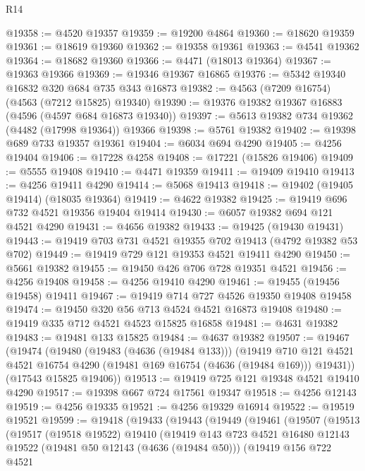 \begin{lexlean}{R14}
\begin{coremodule}
@19358 := @4520 @19357
@19359 := @19200 @4864
@19360 := @18620 @19359
@19361 := @18619 @19360
@19362 := @19358 @19361
@19363 := @4541 @19362
@19364 := @18682 @19360
@19366 := @4471 (@18013 @19364)
@19367 := @19363 @19366
@19369 := @19346 @19367 @16865
@19376 := @5342 @19340 @16832 @320 @684 @735 @343 @16873
@19382 := @4563 (@7209 @16754) (@4563 (@7212 @15825) @19340)
@19390 := @19376 @19382 @19367 @16883 (@4596 (@4597 @684 @16873 @19340))
@19397 := @5613 @19382 @734 @19362 (@4482 (@17998 @19364)) @19366
@19398 := @5761 @19382
@19402 := @19398 @689 @733 @19357 @19361
@19404 := @6034 @694 @4290
@19405 := @4256 @19404
@19406 := @17228 @4258
@19408 := @17221 (@15826 @19406)
@19409 := @5555 @19408
@19410 := @4471 @19359
@19411 := @19409 @19410
@19413 := @4256 @19411 @4290
@19414 := @5068 @19413
@19418 := @19402 (@19405 @19414) (@18035 @19364)
@19419 := @4622 @19382
@19425 := @19419 @696 @732 @4521 @19356 @19404 @19414
@19430 := @6057 @19382 @694 @121 @4521 @4290
@19431 := @4656 @19382
@19433 := @19425 (@19430 @19431)
@19443 := @19419 @703 @731 @4521 @19355 @702 @19413 (@4792 @19382 @53 @702)
@19449 := @19419 @729 @121 @19353 @4521 @19411 @4290
@19450 := @5661 @19382
@19455 := @19450 @426 @706 @728 @19351 @4521
@19456 := @4256 @19408
@19458 := @4256 @19410 @4290
@19461 := @19455 (@19456 @19458) @19411
@19467 := @19419 @714 @727 @4526 @19350 @19408 @19458
@19474 := @19450 @320 @56 @713 @4524 @4521 @16873 @19408
@19480 := @19419 @335 @712 @4521 @4523 @15825 @16858
@19481 := @4631 @19382
@19483 := @19481 @133 @15825
@19484 := @4637 @19382
@19507 := @19467
    (@19474
      (@19480
        (@19483 (@4636 (@19484 @133)))
        (@19419
          @710
          @121
          @4521
          @4521
          @16754
          @4290
          (@19481 @169 @16754 (@4636 (@19484 @169)))
          @19431))
      (@17543 @15825 @19406))
@19513 := @19419 @725 @121 @19348 @4521 @19410 @4290
@19517 := @19398 @667 @724 @17561 @19347
@19518 := @4256 @12143
@19519 := @4256 @19335
@19521 := @4256 @19329 @16914
@19522 := @19519 @19521
@19599 := @19418
    (@19433
      (@19443
        (@19449
          (@19461
            (@19507
              (@19513
                (@19517
                  (@19518 @19522)
                  @19410
                  (@19419
                    @143
                    @723
                    @4521
                    @16480
                    @12143
                    @19522
                    (@19481 @50 @12143 (@4636 (@19484 @50)))
                    (@19419
                      @156
                      @722
                      @4521

\end{coremodule}
\end{lexlean}
